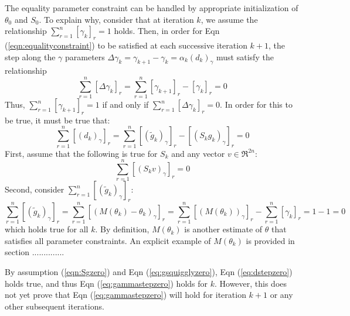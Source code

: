\documentclass[letter,12pt]{article}
\begin{document}
The equality parameter constraint can be handled by appropriate initialization of $\theta_0$ and $S_0$.  To explain why, consider that at iteration $k$, we assume the relationship $\sum_{r=1}^{n}[\gamma_{k}]_r=1$ holds.  Then, in order for Eqn (\ref{eqn:equalityconstraint}) to be satisfied at each successive iteration $k+1$, the step along the $\gamma$ parameters $\Delta \gamma_k = \gamma_{k+1} - \gamma_k = \alpha_k(d_k)_{\gamma}$ must satisfy the relationship
\begin{equation} \label{eq:gammastepzero}
\sum_{r=1}^{n} [\Delta \gamma_k]_r
=
\sum_{r=1}^{n}[\gamma_{k+1}]_r - [\gamma_k]_r
= 0
\end{equation}
Thus, $\sum_{r=1}^{n}[\gamma_{k+1}]_r=1$ if and only if $\sum_{r=1}^{n} [\Delta \gamma_k]_r = 0$.  In order for this to be true, it must be true that:
\begin{equation} \label{eq:dstepzero}
\sum_{r=1}^{n} [(d_k)_{\gamma}]_r
=
\sum_{r=1}^{n} [(\tilde{g}_k)_{\gamma}]_r - [(S_kg_k)_{\gamma}]_r = 0
\end{equation}
First, assume that the following is true for $S_{k}$ and any vector $v \in \Re^{2n}$:
\begin{equation} \label{eqn:Sgzero}
\sum_{r=1}^{n} [(S_{k}v)_{\gamma}]_r = 0
\end{equation}
Second, consider $\sum_{r=1}^{n} [(\tilde{g}_k)_{\gamma}]_r$:
\begin{equation} \label{eq:gsquigglyzero}
\sum_{r=1}^{n} [(\tilde{g}_k)_{\gamma}]_r
=
\sum_{r=1}^{n} [(M(\theta_k) - \theta_k)_{\gamma}]_r
=
\sum_{r=1}^{n} [(M(\theta_k))_{\gamma}]_r - \sum_{r=1}^{n} [\gamma_k]_r = 1 - 1 = 0
\end{equation}
which holds true for all $k$.  By definition, $M(\theta_k)$ is another estimate of $\theta$ that satisfies all parameter constraints.  An explicit example of $M(\theta_k)$ is provided in section ..............  

By assumption (\ref{eqn:Sgzero}) and Eqn (\ref{eq:gsquigglyzero}), Eqn (\ref{eq:dstepzero}) holds true, and thus Eqn (\ref{eq:gammastepzero}) holds for $k$.  However, this does not yet prove that Eqn (\ref{eq:gammastepzero}) will hold for iteration $k+1$ or any other subsequent iterations.  
\end{document}
